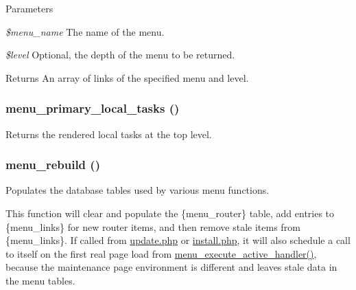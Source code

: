 \begin{DoxyParams}{Parameters}
\item[{\em \$menu\_\-name}]The name of the menu. \item[{\em \$level}]Optional, the depth of the menu to be returned.\end{DoxyParams}
\begin{DoxyReturn}{Returns}
An array of links of the specified menu and level. 
\end{DoxyReturn}
\hypertarget{group__menu_ga83613b83f90d6a12e2f4170ed0ede9b1}{
\subsubsection[{menu\_\-primary\_\-local\_\-tasks}]{\setlength{\rightskip}{0pt plus 5cm}menu\_\-primary\_\-local\_\-tasks ()}}
\label{group__menu_ga83613b83f90d6a12e2f4170ed0ede9b1}
Returns the rendered local tasks at the top level. \hypertarget{group__menu_gaf36dcb9d5491ef5e7d2cf22c1f5c69f4}{
\subsubsection[{menu\_\-rebuild}]{\setlength{\rightskip}{0pt plus 5cm}menu\_\-rebuild ()}}
\label{group__menu_gaf36dcb9d5491ef5e7d2cf22c1f5c69f4}
Populates the database tables used by various menu functions.

This function will clear and populate the \{menu\_\-router\} table, add entries to \{menu\_\-links\} for new router items, and then remove stale items from \{menu\_\-links\}. If called from \hyperlink{update_8php}{update.php} or \hyperlink{install_8php}{install.php}, it will also schedule a call to itself on the first real page load from \hyperlink{group__menu_gae33bae24fcac6126aa272d1c437f947c}{menu\_\-execute\_\-active\_\-handler()}, because the maintenance page environment is different and leaves stale data in the menu tables.

